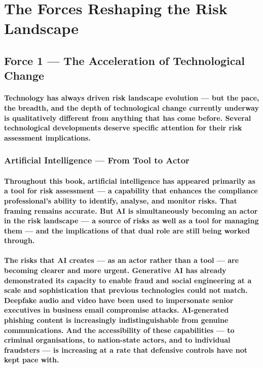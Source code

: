 \section{The Forces Reshaping the Risk Landscape}

\subsection{Force 1 — The Acceleration of Technological Change}

\paragraph{Technology has always driven risk landscape evolution — but the pace, the breadth, and the depth of technological change currently underway is qualitatively different from anything that has come before. Several technological developments deserve specific attention for their risk assessment implications.}
\subsubsection{Artificial Intelligence — From Tool to Actor}
\paragraph{Throughout this book, artificial intelligence has appeared primarily as a tool for risk assessment — a capability that enhances the compliance professional's ability to identify, analyse, and monitor risks. That framing remains accurate. But AI is simultaneously becoming an actor in the risk landscape — a source of risks as well as a tool for managing them — and the implications of that dual role are still being worked through.}
\paragraph{The risks that AI creates — as an actor rather than a tool — are becoming clearer and more urgent. \textbf{Generative AI} has already demonstrated its capacity to enable fraud and social engineering at a scale and sophistication that previous technologies could not match. Deepfake audio and video have been used to impersonate senior executives in business email compromise attacks. AI-generated phishing content is increasingly indistinguishable from genuine communications. And the accessibility of these capabilities — to criminal organisations, to nation-state actors, and to individual fraudsters — is increasing at a rate that defensive controls have not kept pace with.}
